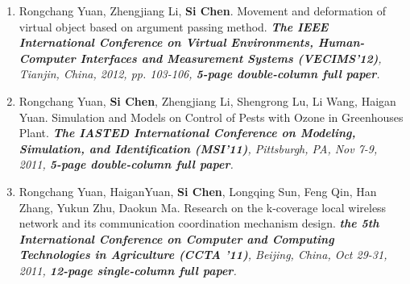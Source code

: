 \documentclass[letter]{article}
\newcommand{\publication}[4]{\item #1. #2. \emph{#3.} #4}
\begin{document}
\begin{description}
\begin{enumerate}[{C-}1.]
\publication{Rongchang Yuan, Zhengjiang Li, \textbf{Si Chen}} {Movement and deformation of virtual object based on argument passing method}  {\textbf{The IEEE International Conference on Virtual Environments, Human-Computer Interfaces and Measurement Systems (VECIMS'12)}, Tianjin, China, 2012, pp. 103-106, \textbf{5-page double-column full paper}} 

\publication{Rongchang Yuan, \textbf{Si Chen}, Zhengjiang Li, Shengrong Lu, Li Wang, Haigan Yuan} {Simulation and Models on Control of Pests with Ozone in Greenhouses Plant}  {\textbf{The IASTED International Conference on Modeling, Simulation, and Identification (MSI'11)}, Pittsburgh, PA, Nov 7-9, 2011, \textbf{5-page double-column full paper}} 

\publication{Rongchang Yuan, HaiganYuan, \textbf{Si Chen}, Longqing Sun, Feng Qin, Han Zhang, Yukun Zhu, Daokun Ma} {Research on the k-coverage local wireless network and its communication coordination mechanism design}  {\textbf{the 5th International Conference on Computer and Computing Technologies in Agriculture (CCTA '11)}, Beijing, China, Oct 29-31, 2011, \textbf{12-page single-column full paper}} 






\end{enumerate}
\end{description}
\end{document}

